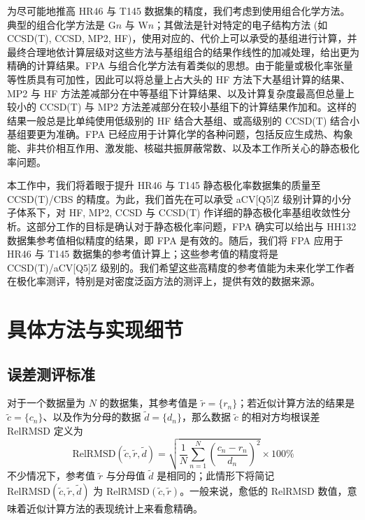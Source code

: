 为尽可能地推高 HR46 与 T145 数据集的精度，我们考虑到使用组合化学方法。典型的组合化学方法是 G$n$\cite{Pople-Curtiss.JCP.1989, Curtiss-Pople.JCP.1990, Curtiss-Pople.JCP.1991, Curtiss-Pople.JCP.1998, Curtiss-Raghavachari.JCP.2007} 与 W$n$\cite{Martin-Oliveira.JCP.1999, Parthiban-Martin.JCP.2001}；其做法是针对特定的电子结构方法 (如 CCSD(T), CCSD, MP2, HF)，使用对应的、代价上可以承受的基组进行计算，并最终合理地依计算层级对这些方法与基组组合的结果作线性的加减处理，给出更为精确的计算结果。FPA 与组合化学方法有着类似的思想\cite{East-Allen.JCP.1993}。由于能量或极化率张量等性质具有可加性，因此可以将总量上占大头的 HF 方法下大基组计算的结果、MP2 与 HF 方法差减部分在中等基组下计算结果、以及计算复杂度最高但总量上较小的 CCSD(T) 与 MP2 方法差减部分在较小基组下的计算结果作加和。这样的结果一般总是比单纯使用低级别的 HF 结合大基组、或高级别的 CCSD(T) 结合小基组要更为准确。FPA 已经应用于计算化学的各种问题，包括反应生成热\cite{East-Allen.JCP.1993, Nielsen-Schaefer.JCP.1997}、构象能\cite{Csaszar-Schaefer.JCP.1998, Tschumper-Tschumper.JCP.2001, Kahn-Kahn.JCC.2008}、非共价相互作用\cite{Tschumper-Quack.JCP.2002, Jurecka-Hobza.PCCP.2006, Marshall-Sherrill.JCP.2011}、激发能\cite{Bokareva-Godunov.IJQC.2008}、核磁共振屏蔽常数\cite{Sun-Xu.JCP.2013, Wang-Xu.JCP.2018}、以及本工作所关心的静态极化率问题\cite{Huzak-Deleuze.JCP.2013, Monten-Deleuze.MP.2011}。

本工作中，我们将着眼于提升 HR46 与 T145 静态极化率数据集的质量至 CCSD(T)/CBS 的精度。为此，我们首先在可以承受 aCV[Q5]Z 级别计算的小分子体系下，对 HF, MP2, CCSD 与 CCSD(T) 作详细的静态极化率基组收敛性分析。这部分工作的目标是确认对于静态极化率问题，FPA 确实可以给出与 HH132 数据集参考值相似精度的结果，即 FPA 是有效的。随后，我们将 FPA 应用于 HR46 与 T145 数据集的参考值计算上；这些参考值的精度将是 CCSD(T)/aCV[Q5]Z 级别的。我们希望这些高精度的参考值能为未来化学工作者在极化率测评，特别是对密度泛函方法的测评上，提供有效的数据来源。

\section{具体方法与实现细节}
\label{sec.5.detail}

\subsection{误差测评标准}

对于一个数据量为 $N$ 的数据集，其参考值是 $\tilde r = \{ r_n \}$；若近似计算方法的结果是 $\tilde c = \{ c_n \}$、以及作为分母的数据 $\tilde d = \{ d_n \}$，那么数据 $\tilde c$ 的相对方均根误差 RelRMSD 定义为
\begin{equation}
    \label{eq.5.relrmsd}
    \text{RelRMSD} (\tilde c, \tilde r, \tilde d) = \sqrt{\frac{1}{N} \sum_{n = 1}^N \left( \frac{c_n - r_n}{d_n} \right)^2} \times 100\%
\end{equation}
不少情况下，参考值 $\tilde r$ 与分母值 $\tilde d$ 是相同的；此情形下将简记 $\text{RelRMSD} (\tilde c, \tilde r, \tilde d)$ 为 $\text{RelRMSD} (\tilde c, \tilde r)$。一般来说，愈低的 RelRMSD 数值，意味着近似计算方法的表现统计上来看愈精确。

